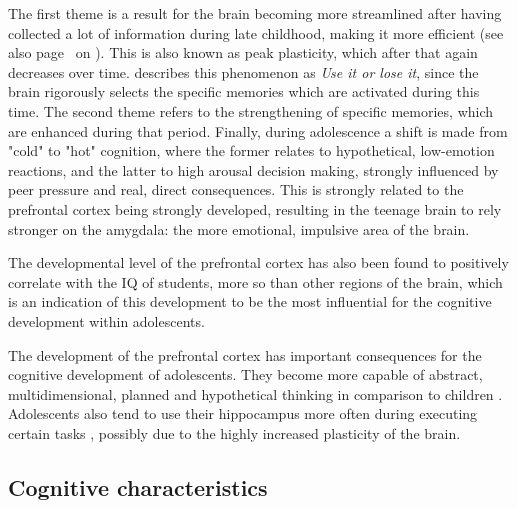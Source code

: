 The first theme is a result for the brain becoming more streamlined after having collected a lot of information during late childhood, making it more efficient (see also page~\pageref{subsec:interferencedecay} on ). This is also known as peak plasticity, which after that again decreases over time.  describes this phenomenon as \emph{Use it or lose it}, since the brain rigorously selects the specific memories which are activated during this time. The second theme refers to the strengthening of specific memories, which are enhanced during that period. Finally, during adolescence a shift is made from "cold" to "hot" cognition, where the former relates to hypothetical, low-emotion reactions, and the latter to high arousal decision making, strongly influenced by peer pressure and real, direct consequences. This is strongly related to the prefrontal cortex being strongly developed, resulting in the teenage brain to rely stronger on the amygdala: the more emotional, impulsive area of the brain.

The developmental level of the prefrontal cortex has also been found to positively correlate with the IQ of students, more so than other regions of the brain, which is an indication of this development to be the most influential for the cognitive development within adolescents.

The development of the prefrontal cortex has important consequences for the cognitive development of adolescents. They become more capable of abstract, multidimensional, planned and hypothetical thinking in comparison to children \cite{steinberg}. Adolescents also tend to use their hippocampus more often during executing certain tasks \cite{finn}, possibly due to the highly increased plasticity of the brain.

\subsection{Cognitive characteristics}

